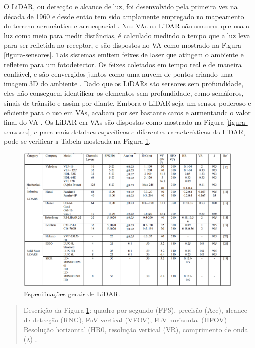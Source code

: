 O LiDAR, ou detecção e alcance de luz, foi desenvolvido pela primeira vez na década de 1960 e desde então tem sido amplamente empregado no mapeamento de terreno aeronáutico e aeroespacial \cite{sensors}. Nos VAs os LiDAR são sensores que usa a luz como meio para medir distâncias, é calculado medindo o tempo que a luz leva para ser refletida no receptor, e são dispostos no VA como mostrado na Figura \ref{figura-sensores}. Tais sistemas emitem feixes de laser que atingem o ambiente e refletem para um fotodetector. Os feixes coletados em tempo real e de maneira confiável, e  são convergidos juntos como uma nuvem de pontos criando uma imagem 3D do ambiente \cite{aplicacao2}. Dado que os LiDARs são sensores sem profundidade, eles não conseguem identificar os elementos sem profundidade, como semáforos, sinais de trânsito e assim por diante.
Embora o LiDAR seja um sensor poderoso e eficiente para o uso em VAs, acabam por ser bastante caros e aumentando o valor final do VA \cite{review-auto}. 
Os LiDAR em VAs são dispostas como mostrado na Figura \ref{figura-sensores}, e para mais detalhes específicos e diferentes características do LiDAR, pode-se verificar a Tabela mostrada na Figura \ref{tabela-lidar}.
\begin{figure}[H]
\centering
\includegraphics[width=\textwidth]{Figures/lidar-table.png}
\caption{Especificações gerais de LiDAR.}
\label{tabela-lidar}
\end{figure}

\begin{quote}
Descrição da Figura \ref{tabela-lidar}: quadro por segundo (FPS), precisão (Acc), alcance de detecção (RNG), FoV vertical (VFOV), FoV horizontal (HFOV) Resolução horizontal (HR0, resolução vertical (VR), comprimento de onda ($\lambda$) \cite{sensors}.
\end{quote}

